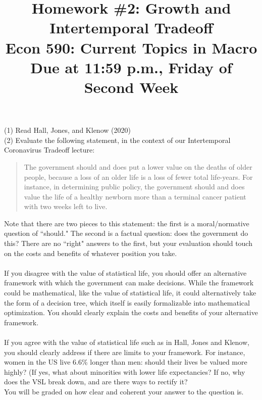 \documentclass[a4paper]{article}
\title{{\Large \bf Homework \#2: Growth and Intertemporal Tradeoff} \\ \small Econ 590: Current Topics in Macro \\ \small Due at 11:59 p.m., Friday of Second Week}
\date{}
\begin{document}
\maketitle
 
\noindent
(1) Read Hall, Jones, and Klenow (2020)\\

(2)  Evaluate the following statement, in the context of our Intertemporal Coronavirus Tradeoff lecture:  
\begin{quote}
\noindent
The government should and does put a lower value on the deaths of older people, because a loss of an older life is a loss of fewer total life-years.  For instance, in determining public policy, the government should and does value the life of a healthy newborn more than a terminal cancer patient with two weeks left to live.
\end{quote}  
Note that there are two pieces to this statement: the first is a moral/normative question of ``should."  The second is a factual question: does the government do this?   There are no ``right" answers to the first, but your evaluation should touch on the costs and benefits of whatever position you take.  \\
\ \\
If you disagree with the value of statistical life, you should offer an alternative framework with which the government can make decisions.  While the framework could be mathematical, like the value of statistical life, it could alternatively take the form of a decision tree, which itself is easily formalizable into mathematical optimization.  You should clearly explain the costs and benefits of your alternative framework.\ \\
\\
If you agree with the value of statistical life such as in Hall, Jones and Klenow, you should clearly address if there are limits to your framework.  For instance, women in the US live 6.6\% longer than men: should their lives be valued more highly?  (If yes, what about minorities with lower life expectancies? If no, why does the VSL break down, and are there ways to rectify it?\\

You will be graded on how clear and coherent your answer to the question is.\\
\end{document}
